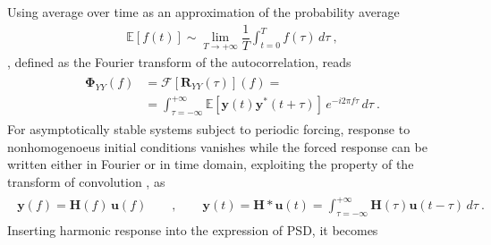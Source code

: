 \documentclass[letterpaper,10pt,english]{jupyterBook}
\begin{document}
\sphinxAtStartPar
Using average over time as an approximation of the probability average
\begin{equation*}
\begin{split}\mathbb{E}[ f(t) ] \sim \lim_{T \rightarrow +\infty} \dfrac{1}{T} \int_{t=0}^{T} f(\tau) \, d \tau \ ,\end{split}
\end{equation*}
\sphinxAtStartPar
{}, defined as the Fourier transform of the auto\sphinxhyphen{}correlation, reads
\begin{equation*}
\begin{split}\begin{aligned}
  \boldsymbol{\Phi}_{YY}(f)
  & = \mathscr{F}[ \mathbf{R}_{YY}(\tau) ](f) = \\ 
  & = \int_{\tau = -\infty}^{+\infty} \mathbb{E} \left[ \mathbf{y}(t) \mathbf{y}^*(t+\tau) \right]  \, e^{-i 2 \pi f \tau} \, d \tau \ .
\end{aligned}\end{split}
\end{equation*}
\sphinxAtStartPar
For asymptotically stable systems subject to periodic forcing, response to non\sphinxhyphen{}homogenoeus initial conditions vanishes while the forced response can be written either in Fourier or in time domain, exploiting the property of the transform of convolution {\hyperref[\detokenize{ch/complex/fourier-transform:transform:fourier:convolution}]{}}, as
\begin{equation*}
\begin{split}\begin{aligned}
  \mathbf{y}(f) = \mathbf{H}(f) \, \mathbf{u}(f) \qquad , \qquad
  \mathbf{y}(t) = \mathbf{H} \ast \mathbf{u}(t) = \int_{\tau=-\infty}^{+\infty} \mathbf{H}(\tau) \mathbf{u}(t - \tau) \, d \tau \ .
\end{aligned}\end{split}
\end{equation*}
\sphinxAtStartPar
Inserting harmonic response into the expression of PSD, it becomes
\end{document}

